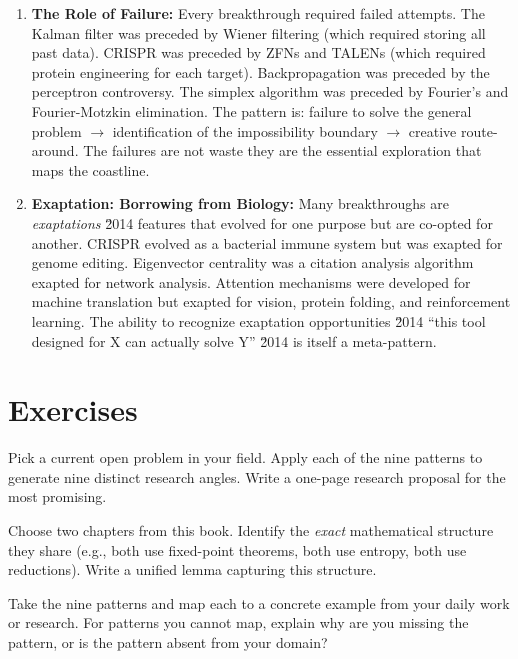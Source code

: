 \begin{enumerate}
\item \textbf{The Role of Failure:} Every breakthrough required failed attempts. The Kalman filter was preceded by Wiener filtering (which required storing all past data). CRISPR was preceded by ZFNs and TALENs (which required protein engineering for each target). Backpropagation was preceded by the perceptron controversy. The simplex algorithm was preceded by Fourier's and Fourier-Motzkin elimination. The pattern is: failure to solve the general problem $\to$ identification of the impossibility boundary $\to$ creative route-around. The failures are not waste they are the essential exploration that maps the coastline.

\item \textbf{Exaptation: Borrowing from Biology:} Many breakthroughs are \emph{exaptations} \u2014 features that evolved for one purpose but are co-opted for another. CRISPR evolved as a bacterial immune system but was exapted for genome editing. Eigenvector centrality was a citation analysis algorithm exapted for network analysis. Attention mechanisms were developed for machine translation but exapted for vision, protein folding, and reinforcement learning. The ability to recognize exaptation opportunities \u2014 ``this tool designed for X can actually solve Y'' \u2014 is itself a meta-pattern.
\end{enumerate}

\section{Exercises}
\label{sec:anatomy:exercises}

\begin{exercise}[Basic]
Pick a current open problem in your field. Apply each of the nine patterns to generate nine distinct research angles. Write a one-page research proposal for the most promising.
\end{exercise}

\begin{exercise}[Basic]
Choose two chapters from this book. Identify the \emph{exact} mathematical structure they share (e.g., both use fixed-point theorems, both use entropy, both use reductions). Write a unified lemma capturing this structure.
\end{exercise}

\begin{exercise}[Basic]
Take the nine patterns and map each to a concrete example from your daily work or research. For patterns you cannot map, explain why are you missing the pattern, or is the pattern absent from your domain?
\end{exercise}

